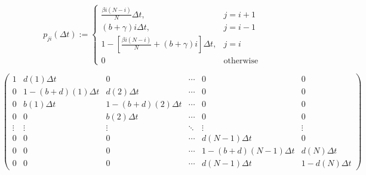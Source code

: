 \documentclass[9pt]{beamer}
\begin{document}
%   
    \begin{frame}{}
        \begin{equation*}
            p_{ji}(\Delta t):=
                \begin{cases}
                    \frac{\beta i (N - i)}{N} \Delta t,     
                        & j = i + 1
                    \\
                    (b + \gamma) i \Delta t, 
                        &   j = i - 1
                    \\
                    1 - \left [
                            \frac{\beta i (N - i)}{N} +
                            (b + \gamma) i %
                        \right] \Delta t, 
                        & j=i
                    \\
                    0 & \text{otherwise}
                \end{cases}
        \end{equation*}
    \end{frame}
    \begin{frame}{}
        \begin{equation*}
            \begin{pmatrix}
                1   & d(1) \Delta t & 0 & \cdots    & 0 & 0
                \\
                0   & 1 - (b+d)(1) \Delta t     & d(2)  \Delta t    & \cdots    & 0 & 0 
                \\
                0   &   b(1) \Delta t   & 1 - (b+d)(2) \Delta t     & \cdots    & 0 & 0
                \\
                0   & 0 & b(2) \Delta t     & \cdots    & 0 & 0
                \\
                \vdots  & \vdots & \vdots   & \ddots    & \vdots    & \vdots
                \\
                0   & 0 & 0 & \cdots & d (N - 1) \Delta t   & 0
                \\
                0   & 0 & 0 & \cdots & 1- (b+d) (N - 1) \Delta t    & d(N) \Delta t
                \\
                0   & 0 & 0 & \cdots & d (N - 1) \Delta t   &  1 - d(N) \Delta t 
            \end{pmatrix}
        \end{equation*}
    \end{frame}
\end{document}
